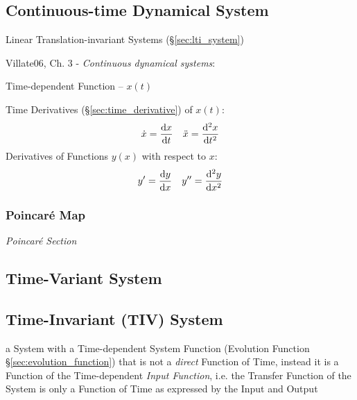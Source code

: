 \subsection{Continuous-time Dynamical System}
\label{sec:continuous_dynamical_system}

\fist Linear Translation-invariant Systems (\S\ref{sec:lti_system})

Villate06, Ch. 3 - \emph{Continuous dynamical systems}:

Time-dependent Function -- $x(t)$

Time Derivatives (\S\ref{sec:time_derivative}) of $x(t)$:
\begin{align*}
  \dot{x} &= \frac{\mathrm{d}x}{\mathrm{d}t} & \ddot{x} &= \frac{\mathrm{d}^2x}{\mathrm{d}t^2} \\
\end{align*}
Derivatives of Functions $y(x)$ with respect to $x$:
\begin{align*}
  y' &= \frac{\mathrm{d}y}{\mathrm{d}x} & y'' &= \frac{\mathrm{d}^2y}{\mathrm{d}x^2} \\
\end{align*}



\subsubsection{Poincar\'e Map}\label{sec:poincare_map}

\emph{Poincar\'e Section}



\subsection{Time-Variant System}\label{sec:time_variant_system}

\subsection{Time-Invariant (TIV) System}\label{sec:tiv_system}

a System with a Time-dependent System Function (Evolution Function
\S\ref{sec:evolution_function}) that is not a \emph{direct} Function of Time,
instead it is a Function of the Time-dependent \emph{Input Function}, i.e. the
Transfer Function of the System is only a Function of Time as expressed by the
Input and Output

